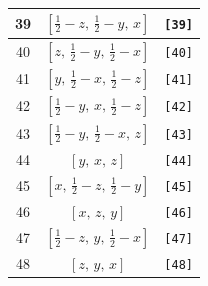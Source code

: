 \documentclass[fleqn,8pt]{jsarticle}
\begin{document}
\begin{longtable}{ccc}
39 & $\left[ \frac{1}{2} - z,\, \frac{1}{2} - y,\, x \right]$ & {\tt [39]} \\ \hline
40 & $\left[ z,\, \frac{1}{2} - y,\, \frac{1}{2} - x \right]$ & {\tt [40]} \\ \hline
41 & $\left[ y,\, \frac{1}{2} - x,\, \frac{1}{2} - z \right]$ & {\tt [41]} \\ \hline
42 & $\left[ \frac{1}{2} - y,\, x,\, \frac{1}{2} - z \right]$ & {\tt [42]} \\ \hline
43 & $\left[ \frac{1}{2} - y,\, \frac{1}{2} - x,\, z \right]$ & {\tt [43]} \\ \hline
44 & $\left[ y,\, x,\, z \right]$ & {\tt [44]} \\ \hline
45 & $\left[ x,\, \frac{1}{2} - z,\, \frac{1}{2} - y \right]$ & {\tt [45]} \\ \hline
46 & $\left[ x,\, z,\, y \right]$ & {\tt [46]} \\ \hline
47 & $\left[ \frac{1}{2} - z,\, y,\, \frac{1}{2} - x \right]$ & {\tt [47]} \\ \hline
48 & $\left[ z,\, y,\, x \right]$ & {\tt [48]} \\
\end{longtable}
\end{document}
